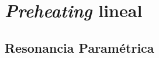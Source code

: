 \documentclass{beamer}
\begin{document}
    \begin{frame}
        \begin{figure}[H]
        \end{figure}
    \end{frame}

    \section{\textit{Preheating} lineal}

        \subsection{Resonancia Paramétrica}
\end{document}
